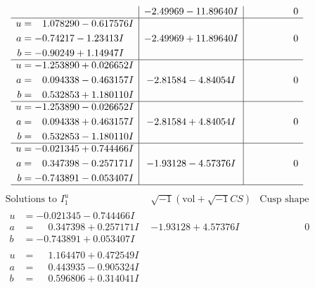 \documentclass[1p]{elsarticle_modified}
\theoremstyle{definition}
\newcommand{\I}{\sqrt{-1}}
\begin{document}
$$\begin{array}{c|c|c}
 & -2.49969 - 11.89640 I & \phantom{-0.000000 } 0 \\ \hline\begin{aligned}
u &= \phantom{-}1.078290 - 0.617576 I \\
a &= -0.74217 - 1.23413 I \\
b &= -0.90249 + 1.14947 I\end{aligned}
 & -2.49969 + 11.89640 I & \phantom{-0.000000 } 0 \\ \hline\begin{aligned}
u &= -1.253890 + 0.026652 I \\
a &= \phantom{-}0.094338 - 0.463157 I \\
b &= \phantom{-}0.532853 + 1.180110 I\end{aligned}
 & -2.81584 - 4.84054 I & \phantom{-0.000000 } 0 \\ \hline\begin{aligned}
u &= -1.253890 - 0.026652 I \\
a &= \phantom{-}0.094338 + 0.463157 I \\
b &= \phantom{-}0.532853 - 1.180110 I\end{aligned}
 & -2.81584 + 4.84054 I & \phantom{-0.000000 } 0 \\ \hline\begin{aligned}
u &= -0.021345 + 0.744466 I \\
a &= \phantom{-}0.347398 - 0.257171 I \\
b &= -0.743891 - 0.053407 I\end{aligned}
 & -1.93128 - 4.57376 I & \phantom{-0.000000 } 0\\
 \hline 
 \end{array}$$\newpage$$\begin{array}{c|c|c}  
\text{Solutions to }I^u_{1}& \I (\text{vol} + \sqrt{-1}CS) & \text{Cusp shape}\\
 \hline 
\begin{aligned}
u &= -0.021345 - 0.744466 I \\
a &= \phantom{-}0.347398 + 0.257171 I \\
b &= -0.743891 + 0.053407 I\end{aligned}
 & -1.93128 + 4.57376 I & \phantom{-0.000000 } 0 \\ \hline\begin{aligned}
u &= \phantom{-}1.164470 + 0.472549 I \\
a &= \phantom{-}0.443935 - 0.905324 I \\
b &= \phantom{-}0.596806 + 0.314041 I\end{aligned}

\end{array}$$
\end{document}
